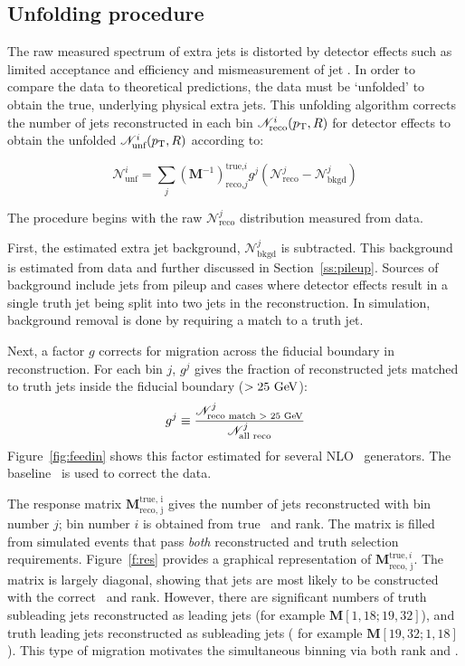 \subsection{Unfolding procedure}
\label{ss:unfproc}
The raw measured spectrum of extra jets is distorted by detector effects such as limited acceptance and efficiency and mismeasurement of jet \pt. 
In order to compare the data to theoretical predictions, the data must be `unfolded' to obtain the true, underlying physical extra jets. This unfolding algorithm corrects the number of jets reconstructed in each bin ${\mathscr N}^i_{\textrm {reco} }(p_{\text{T}},R)$ for detector effects to obtain the unfolded ${\mathscr N}^i_{\textrm{unf} }(p_{\text{T}},R)$ according to:

\begin{equation}
{\mathscr N}^i_{\textrm {unf}}= \sum_j \left ({\mathbf M}^{-1} \right )_{\textrm{reco,} j}^{\textrm{true,} i} g^j \left ({\mathscr N}^j_{\textrm {reco}}-{\mathscr N}^j_{\textrm{bkgd}}\right )
\label{eqn:unf}
\end{equation}

\noindent
The procedure begins with the raw ${\mathscr N}^j_{\textrm {reco}}$ distribution measured from data. 

First, the estimated extra jet background, ${\mathscr N}^j_{\textrm{bkgd}}$ is subtracted. This background is estimated from data and further discussed in Section~\ref{ss:pileup}. Sources of background  include jets from pileup and cases where
detector effects result in a single truth jet being split into 
two jets in the reconstruction. In simulation, background removal is done by requiring a match to a truth jet. 

Next, a factor $g$ corrects for migration across the fiducial boundary in reconstruction. For each bin $j$, $g^j$ gives the fraction of reconstructed jets matched to truth jets inside the fiducial boundary ($>25 \gev$):
\begin{displaymath}
g^j \equiv \frac{{\mathscr N}^j_{\textrm {reco match > 25 \gev}}} {{\mathscr N}^j_{\textrm {all reco}}}
\label{eqn:feedin}
\end{displaymath}
Figure~\ref{fig:feedin} shows this factor estimated for several NLO \ttbar\ generators. The baseline \powpy\ is used to correct the data.

The response matrix ${\mathbf M}_{\textrm{reco, j}}^{\textrm{true, i}}$ gives the number of jets reconstructed with bin number $j$; bin number $i$ is obtained from true \pt\ and rank.
The matrix is 
filled from simulated events that pass \textit{ both} reconstructed and truth selection requirements.
Figure~\ref{f:res} provides a graphical representation of ${\mathbf M}_{\textrm{reco, j}}^{\textrm{true}, i}$. 
The matrix is largely diagonal, showing that jets are most likely to be constructed with the correct \pt\ and rank.
However, there are significant numbers of truth subleading jets reconstructed as leading jets (for example ${\mathbf M}[1,18; 19,32]$), and 
truth leading jets reconstructed as subleading jets ( for example ${\mathbf M}[19,32;1,18]$). This type of migration motivates the simultaneous binning via both rank and \pt.



